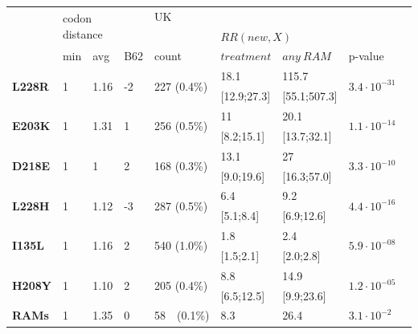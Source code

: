 \documentclass[
  11pt,
  twoside]{scrbook}
\begin{document}
\begin{table}
\centering
\begin{tabular}{@{}lllllllll@{}}
\hline
\multirow{3}{*}{} & \multicolumn{2}{l}{\multirow{2}{*}{codon distance}} & & \multicolumn{3}{l}{UK} & \\ \cmidrule(lr){5-7}
& \multicolumn{2}{l}{} & & & \multicolumn{2}{l}{$RR(new,X)$} & \\ \cmidrule(lr){2-3} \cmidrule(lr){6-7}
& min & avg & B62 & count & $treatment$ & $any~RAM$ & p-value \\ \hline
\multirow{2}{*}{\textbf{L228R}} & \multirow{2}{*}{1} & \multirow{2}{*}{1.16} & \multirow{2}{*}{-2} & \multirow{2}{*}{227 (0.4\%)} & 18.1 & 115.7 & \multirow{2}{*}{$3.4\cdot10^{-31}$} \\
& & & & & {[}12.9;27.3{]} & {[}55.1;507.3{]} & \\
\multirow{2}{*}{\textbf{E203K}} & \multirow{2}{*}{1} & \multirow{2}{*}{1.31} & \multirow{2}{*}{1} & \multirow{2}{*}{256 (0.5\%)} & 11 & 20.1 & \multirow{2}{*}{$1.1\cdot10^{-14}$} \\
& & & & & {[}8.2;15.1{]} & {[}13.7;32.1{]} & \\
\multirow{2}{*}{\textbf{D218E}} & \multirow{2}{*}{1} & \multirow{2}{*}{1} & \multirow{2}{*}{2} & \multirow{2}{*}{168 (0.3\%)} & 13.1 & 27 & \multirow{2}{*}{$3.3\cdot10^{-10}$} \\
& & & & & {[}9.0;19.6{]} & {[}16.3;57.0{]} & \\
\multirow{2}{*}{\textbf{L228H}} & \multirow{2}{*}{1} & \multirow{2}{*}{1.12} & \multirow{2}{*}{-3} & \multirow{2}{*}{287 (0.5\%)} & 6.4 & 9.2 & \multirow{2}{*}{$4.4\cdot10^{-16}$} \\
& & & & & {[}5.1;8.4{]} & {[}6.9;12.6{]} & \\
\multirow{2}{*}{\textbf{I135L}} & \multirow{2}{*}{1} & \multirow{2}{*}{1.16} & \multirow{2}{*}{2} & \multirow{2}{*}{540 (1.0\%)} & 1.8 & 2.4 & \multirow{2}{*}{$5.9\cdot10^{-08}$} \\
& & & & & {[}1.5;2.1{]} & {[}2.0;2.8{]} & \\
\multirow{2}{*}{\textbf{H208Y}} & \multirow{2}{*}{1} & \multirow{2}{*}{1.10} & \multirow{2}{*}{2} & \multirow{2}{*}{205 (0.4\%)} & 8.8 & 14.9 & \multirow{2}{*}{$1.2\cdot10^{-05}$} \\
& & & & & {[}6.5;12.5{]} & {[}9.9;23.6{]} & \\ \hline
\textbf{RAMs} & 1 & 1.35 & 0 & 58~~(0.1\%) & 8.3 & 26.4 & $3.1\cdot10^{-2}$\\

\end{tabular}
\end{table}
\end{document}
